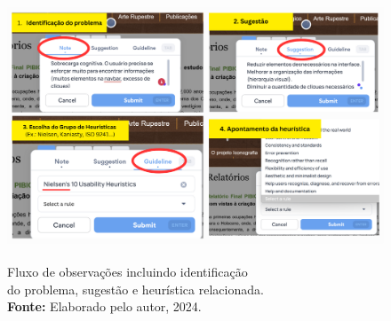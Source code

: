 \begin{figure}[H]
    \centering
    \includegraphics[height=8cm, keepaspectratio]{img/heurio/fluxo heurio.png}
    \caption{ Fluxo de observações incluindo identificação \\do problema, sugestão e heurística relacionada. \\
        \textbf{Fonte:} Elaborado pelo autor, 2024.}
    \label{fig:fluxo heurio}
\end{figure}


